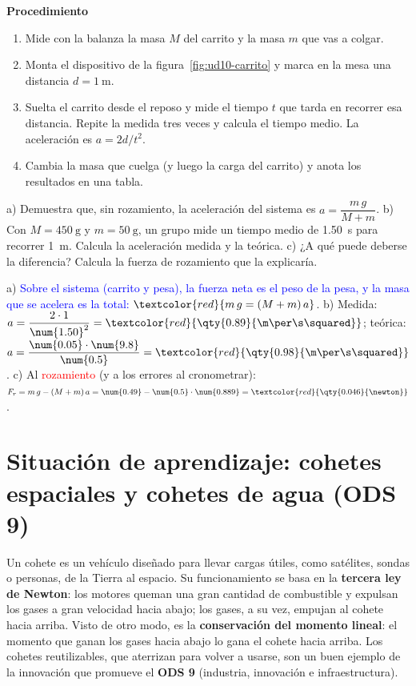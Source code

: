 \textbf{Procedimiento}
\begin{enumerate}[label=\numberballgreen]
    \item Mide con la balanza la masa \(M\) del carrito y la masa \(m\) que vas a colgar.
    \item Monta el dispositivo de la figura~\ref{fig:ud10-carrito} y marca en la mesa una distancia \(d = \qty{1}{\m}\).
    \item Suelta el carrito desde el reposo y mide el tiempo \(t\) que tarda en recorrer esa distancia. Repite la medida tres veces y
    calcula el tiempo medio. La aceleración es \(a = 2d/t^2\).
    \item Cambia la masa que cuelga (y luego la carga del carrito) y anota los resultados en una tabla.
\end{enumerate}

\begin{exercise}
    a) Demuestra que, sin rozamiento, la aceleración del sistema es \(a = \dfrac{m\,g}{M + m}\). b) Con \(M = \qty{450}{\g}\) y
    \(m = \qty{50}{\g}\), un grupo mide un tiempo medio de \qty{1.50}{\s} para recorrer \qty{1}{\m}. Calcula la aceleración medida
    y la teórica. c) ¿A qué puede deberse la diferencia? Calcula la fuerza de rozamiento que la explicaría.
    \begin{solu}
        a) \textcolor{blue}{Sobre el sistema (carrito y pesa), la fuerza neta es el peso de la pesa, y la masa que se acelera es la
        total:} \(\textcolor{red}{m\,g = (M + m)\,a}\). b) Medida: \(a = \dfrac{2 \cdot 1}{\num{1.50}^2} =
        \textcolor{red}{\qty{0.89}{\m\per\s\squared}}\); teórica: \(a = \dfrac{\num{0.05} \cdot \num{9.8}}{\num{0.5}} =
        \textcolor{red}{\qty{0.98}{\m\per\s\squared}}\). c) Al \textcolor{red}{rozamiento} (y a los errores al cronometrar):
        \(F_r = m\,g - (M + m)\,a = \num{0.49} - \num{0.5} \cdot \num{0.889} = \textcolor{red}{\qty{0.046}{\newton}}\).
    \end{solu}
\end{exercise}

\section{Situación de aprendizaje: cohetes espaciales y cohetes de agua (ODS 9)}\label{sec:ud10-cohetes}

Un cohete es un vehículo diseñado para llevar cargas útiles, como satélites, sondas o personas, de la Tierra al espacio. Su
funcionamiento se basa en la \textbf{tercera ley de Newton}: los motores queman una gran cantidad de combustible y expulsan los gases a
gran velocidad hacia abajo; los gases, a su vez, empujan al cohete hacia arriba. Visto de otro modo, es la \textbf{conservación del
momento lineal}: el momento que ganan los gases hacia abajo lo gana el cohete hacia arriba. Los cohetes reutilizables, que aterrizan
para volver a usarse, son un buen ejemplo de la innovación que promueve el \textbf{ODS 9} (industria, innovación e infraestructura).

